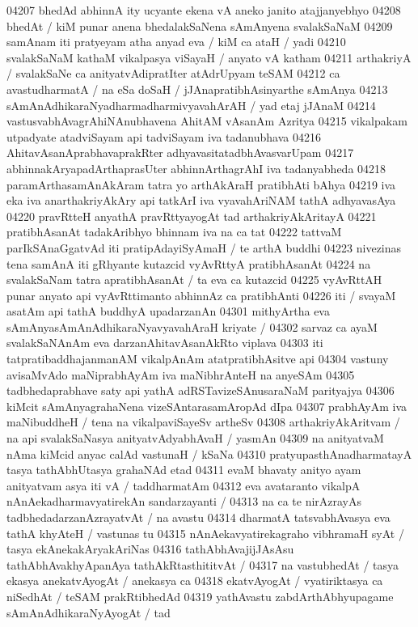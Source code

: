 04207 bhedAd abhinnA ity ucyante ekena vA aneko janito atajjanyebhyo  
04208 bhedAt / kiM punar anena bhedalakSaNena sAmAnyena svalakSaNaM
04209 samAnam iti pratyeyam atha anyad eva / kiM ca ataH / yadi 
04210 svalakSaNaM kathaM vikalpasya viSayaH / anyato vA katham  
04211 arthakriyA / svalakSaNe ca anityatvAdipratIter atAdrUpyam teSAM  
04212 ca avastudharmatA / na eSa doSaH / jJAnapratibhAsinyarthe sAmAnya
04213 sAmAnAdhikaraNyadharmadharmivyavahArAH / yad etaj jJAnaM
04214 vastusvabhAvagrAhiNAnubhavena AhitAM vAsanAm Azritya  
04215 vikalpakam utpadyate atadviSayam api tadviSayam iva tadanubhava 
04216 AhitavAsanAprabhavaprakRter adhyavasitatadbhAvasvarUpam  
04217 abhinnakAryapadArthaprasUter abhinnArthagrAhI iva tadanyabheda
04218 paramArthasamAnAkAram tatra yo arthAkAraH pratibhAti bAhya
04219 iva eka iva anarthakriyAkAry api tatkArI iva vyavahAriNAM tathA adhyavasAya
04220 pravRtteH anyathA pravRttyayogAt tad arthakriyAkAritayA 
04221 pratibhAsanAt tadakAribhyo bhinnam iva na ca tat 
04222 tattvaM parIkSAnaGgatvAd iti pratipAdayiSyAmaH / te arthA buddhi
04223 nivezinas tena samAnA iti gRhyante kutazcid vyAvRttyA pratibhAsanAt 
04224 na svalakSaNam tatra apratibhAsanAt / ta eva ca kutazcid 
04225 vyAvRttAH punar anyato api vyAvRttimanto abhinnAz ca pratibhAnti  
04226 iti / svayaM asatAm api tathA buddhyA upadarzanAn
04301 mithyArtha eva sAmAnyasAmAnAdhikaraNyavyavahAraH kriyate /  
04302 sarvaz ca ayaM svalakSaNAnAm eva darzanAhitavAsanAkRto viplava  
04303 iti tatpratibaddhajanmanAM vikalpAnAm atatpratibhAsitve api  
04304 vastuny avisaMvAdo maNiprabhAyAm iva maNibhrAnteH na anyeSAm 
04305 tadbhedaprabhave saty api yathA adRSTavizeSAnusaraNaM parityajya 
04306 kiMcit sAmAnyagrahaNena vizeSAntarasamAropAd dIpa
04307 prabhAyAm iva maNibuddheH / tena na vikalpaviSayeSv artheSv  
04308 arthakriyAkAritvam / na api svalakSaNasya anityatvAdyabhAvaH / yasmAn
04309 na anityatvaM nAma kiMcid anyac calAd vastunaH / kSaNa  
04310 pratyupasthAnadharmatayA tasya tathAbhUtasya grahaNAd etad 
04311 evaM bhavaty anityo ayam anityatvam asya iti vA / taddharmatAm
04312 eva avataranto vikalpA nAnAekadharmavyatirekAn sandarzayanti /  
04313 na ca te nirAzrayAs tadbhedadarzanAzrayatvAt / na avastu
04314 dharmatA tatsvabhAvasya eva tathA khyAteH / vastunas tu  
04315 nAnAekavyatirekagraho vibhramaH syAt / tasya ekAnekakAryakAriNas
04316 tathAbhAvajijJAsAsu tathAbhAvakhyApanAya tathAkRtasthititvAt /
04317 na vastubhedAt / tasya ekasya anekatvAyogAt / anekasya ca
04318 ekatvAyogAt / vyatiriktasya ca niSedhAt / teSAM prakRtibhedAd
04319 yathAvastu zabdArthAbhyupagame sAmAnAdhikaraNyAyogAt / tad
